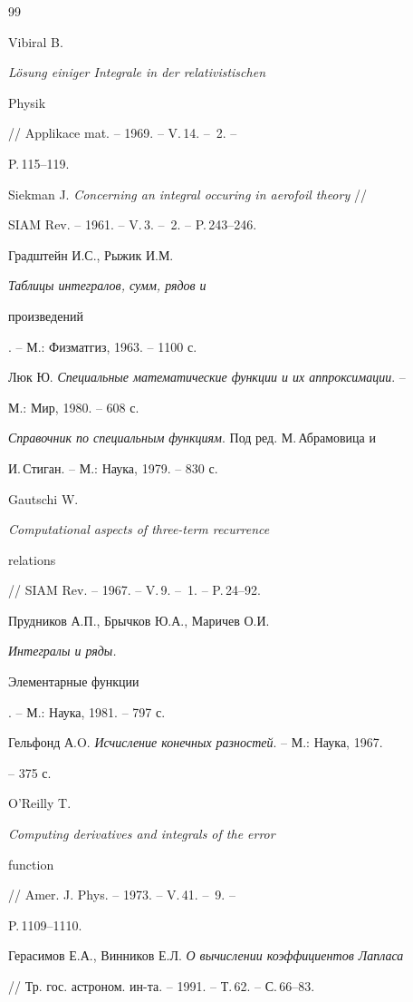 \begin{thebibliography}{99} 


 




Vibiral B. {\em L\"osung einiger Integrale in der relativistischen 


Physik} // Applikace mat. -- 1969. -- V.\,14. -- \No\,2. -- 


P.\,115--119. 




Siekman J. {\em Concerning an integral occuring in aerofoil theory} // 


SIAM Rev. -- 1961. -- V.\,3. -- \No\,2. -- P.\,243--246. 




Градштейн И.С., Рыжик И.М. {\em Таблицы интегралов, сумм, рядов и 


произведений}. -- М.: Физматгиз, 1963. -- 1100 с. 




Люк Ю. {\em Специальные математические функции и их аппроксимации}. -- 


М.: Мир, 1980. -- 608 с. 




{\em Справочник по специальным функциям}. Под ред. М.\,Абрамовица и 


И.\,Стиган. -- М.: Наука, 1979. -- 830 с. 




Gautschi W. {\em Computational aspects of three-term recurrence 


relations} // SIAM Rev. -- 1967. -- V.\,9. -- \No\,1. -- P.\,24--92. 




Прудников А.П., Брычков Ю.А., Маричев О.И. {\em Интегралы и ряды. 


Элементарные функции}. -- М.: Наука, 1981. -- 797 с. 




Гельфонд А.O. {\em Исчисление конечных разностей}. -- М.: Наука, 1967. 


-- 375 с. 




O'Reilly T. {\em Computing derivatives and integrals of the error 


function} // Amer. J. Phys. -- 1973. -- V.\,41. -- \No\,9. -- 


P.\,1109--1110. 




Герасимов Е.А., Винников Е.Л. {\em О вычислении коэффициентов Лапласа} 


// Тр. гос. астроном. ин-та. -- 1991. -- Т.\,62. -- С.\,66--83. 


 


\end{thebibliography} 


 


\vskip 2cm 


 






 


\label{end} 


 


